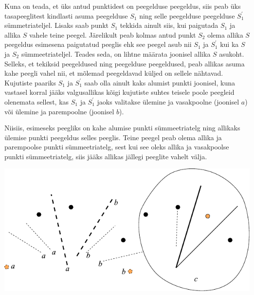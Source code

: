 \solu
Kuna on teada, et üks antud punktidest on peegelduse peegeldus, siis peab üks tasapeeglitest kindlasti asuma peegelduse $S_1$ ning selle peegelduse peegelduse $S_1^\prime$ sümmetriateljel. Lisaks saab punkt $S_1$ tekkida ainult siis, kui paigutada $S_1$ ja allika $S$ vahele teine peegel. Järelikult peab kolmas antud punkt $S_2$ olema allika $S$ peegeldus esimesena paigutatud peeglis ehk see peegel asub nii $S_1$ ja $S_1^\prime$ kui ka $S$ ja $S_2$ sümmeetriateljel. Teades seda, on lihtne määrata joonisel allika $S$ asukoht. Selleks, et tekiksid peegeldused ning peegelduse peegeldused, peab allikas asuma kahe peegli vahel nii, et mõlemad peegeldavad küljed on sellele nähtavad. Kujutiste paariks $S_1$ ja $S_1^\prime$ saab olla ainult kaks alumist punkti joonisel, kuna vastasel korral jääks valgusallikas kõigi kujutiste suhtes teisele poole peegleid olenemata sellest, kas $S_1$ ja $S_1^\prime$ jaoks valitakse ülemine ja vasakpoolne (joonisel $a$) või ülemine ja parempoolne (joonisel $b$).

Niisiis, esimeseks peegliks on kahe alumise punkti sümmeetriatelg ning allikaks ülemise punkti peegeldus selles peeglis. Teine peegel peab olema allika ja parempoolse punkti sümmeetriatelg, sest kui see oleks allika ja vasakpoolse punkti sümmeetriatelg, siis jääks allikas jällegi peeglite vahelt välja.\\

\begin{center}
	\includegraphics[width=0.97\linewidth]{2009-v2g-08-lah}
\end{center}
\probend